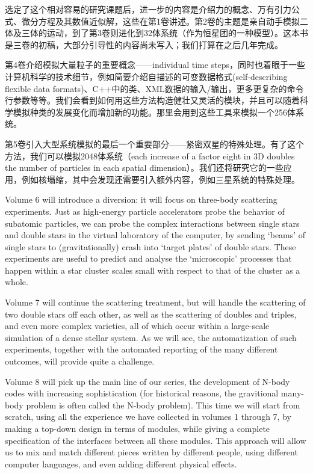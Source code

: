 选定了这个相对容易的研究课题后，进一步的内容是介绍力的概念、万有引力公式、微分方程及其数值近似解，这些在第1卷讲述。第2卷的主题是亲自动手模拟二体及三体的运动，到了第3卷则进化到32体系统（作为恒星团的一种模型）。这本书是三卷的初稿，大部分引导性的内容尚未写入；我们打算在之后几年完成。

第4卷介绍模拟大量粒子的重要概念——individual time steps，同时也着眼于一些计算机科学的技术细节，例如简要介绍自描述的可变数据格式(self-describing flexible data formats)、C++中的类、XML数据的输入/输出，更多更复杂的命令行参数等等。我们会看到如何用这些方法构造健壮又灵活的模块，并且可以随着科学模拟种类的发展变化而增加新的功能。那里会用到这些工具来模拟一个256体系统。

第5卷引入大型系统模拟的最后一个重要部分——紧密双星的特殊处理。有了这个方法，我们可以模拟2048体系统（each increase of a factor eight in 3D doubles the number of particles in each spatial dimension）。我们还将研究它的一些应用，例如核塌缩，其中会发现还需要引入额外内容，例如三星系统的特殊处理。

Volume 6 will introduce a diversion: it will focus on three-body scattering experiments. Just as high-energy particle accelerators probe the behavior of subatomic particles, we can probe the complex interactions between single stars and double stars in the virtual
laboratory of the computer, by sending ‘beams’ of single stars to (gravitationally) crash into ‘target plates’ of double stars. These experiments are useful to predict and analyse the ‘microscopic’ processes that happen within a star cluster scales small with respect to that of the cluster as a whole.

Volume 7 will continue the scattering treatment, but will handle the scattering of two double stars off each other, as well as the scattering of doubles and triples, and even more complex varieties, all of which occur within a large-scale simulation of a dense stellar system. As we will see, the automatization of such experiments, together with the automated reporting of the many different outcomes, will provide quite a challenge.

Volume 8 will pick up the main line of our series, the development of N-body codes with increasing sophistication (for historical reasons, the gravitional many-body problem is often called the N-body problem). This time we will start from scratch, using all the experience we have collected in volumes 1 through 7, by making a top-down design in terms of modules, while giving a complete specification of the interfaces between all these modules. This approach will allow us to mix and match different pieces written by different people, using different computer languages, and even adding different physical effects.

